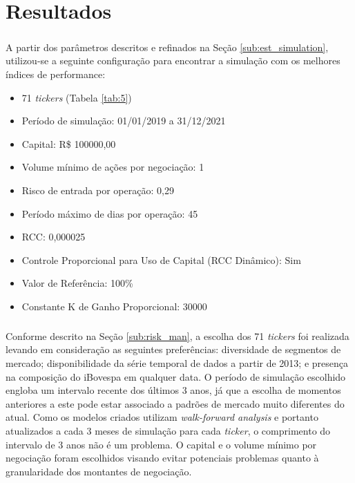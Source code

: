 \chapter{Resultados}
\label{cap4}



\paragraph{} A partir dos parâmetros descritos e refinados na Seção \ref{sub:est_simulation}, utilizou-se a seguinte configuração para encontrar a simulação com os melhores índices de performance:

\begin{itemize}
    \item 71 \textit{tickers} (Tabela \ref{tab:5})
    \item Período de simulação: 01/01/2019 a 31/12/2021
    \item Capital: R\$ 100000,00
    \item Volume mínimo de ações por negociação: 1
    \item Risco de entrada por operação: 0,29
    \item Período máximo de dias por operação: 45
    \item RCC: 0,000025
    \item Controle Proporcional para Uso de Capital (RCC Dinâmico): Sim
    \item Valor de Referência: 100\%
    \item Constante K de Ganho Proporcional: 30000
\end{itemize}

\paragraph{} Conforme descrito na Seção \ref{sub:risk_man}, a escolha dos 71 \textit{tickers} foi realizada levando em consideração as seguintes preferências: diversidade de segmentos de mercado; disponibilidade da série temporal de dados a partir de 2013; e presença na composição do iBovespa em qualquer data. O período de simulação escolhido engloba um intervalo recente dos últimos 3 anos, já que a escolha de momentos anteriores a este pode estar associado a padrões de mercado muito diferentes do atual. Como os modelos criados utilizam \textit{walk-forward analysis} e portanto atualizados a cada 3 meses de simulação para cada \textit{ticker}, o comprimento do intervalo de 3 anos não é um problema. O capital e o volume mínimo por negociação foram escolhidos visando evitar potenciais problemas quanto à granularidade dos montantes de negociação.

